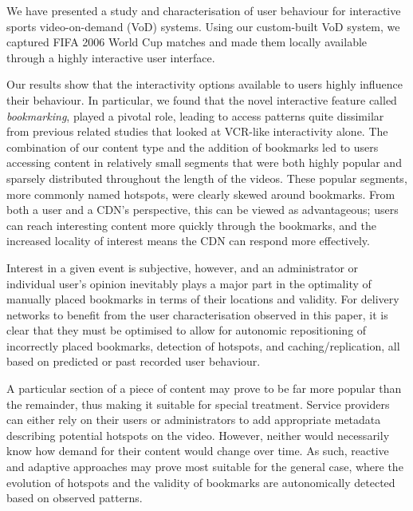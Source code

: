 \documentclass[letterpaper,nocopyrightspace]{sig-alternate}
\begin{document}
We have presented a study and characterisation of user behaviour for
interactive sports video-on-demand (VoD) systems. Using our
custom-built VoD system, we captured FIFA 2006 World Cup matches and
made them locally available through a highly interactive user
interface.

Our results show that the interactivity options available to users
highly influence their behaviour. In particular, we found that the
novel interactive feature called {\em bookmarking}, played a pivotal
role, leading to access patterns quite dissimilar from previous
related studies that looked at VCR-like interactivity alone. The
combination of our content type and the addition of bookmarks led to
users accessing content in relatively small segments that were both
highly popular and sparsely distributed throughout the length of the
videos. These popular segments, more commonly named hotspots, were clearly skewed
around bookmarks. From both a user and a CDN's perspective, this
can be viewed as advantageous; users can reach interesting content
more quickly through the bookmarks, and the increased locality of
interest means the CDN can respond more effectively.


Interest in a given event is subjective, however, and an
administrator or individual user's opinion inevitably plays a major
part in the optimality of manually placed bookmarks in terms of
their locations and validity. For delivery networks to benefit from
the user characterisation observed in this paper, it is clear that
they must be optimised to allow for autonomic repositioning of
incorrectly placed bookmarks, detection of hotspots, and
caching/replication, all based on predicted or past recorded user
behaviour.


A particular section of a piece of content may prove to be far more
popular than the remainder, thus making it suitable for special
treatment. Service providers can either rely on their users or
administrators to add appropriate metadata describing potential
hotspots on the video. However, neither would necessarily know how
demand for their content would change over time. As such, reactive
and adaptive approaches may prove most suitable for the general
case, where the evolution of hotspots and the validity of bookmarks
are autonomically detected based on observed patterns.
\end{document}
